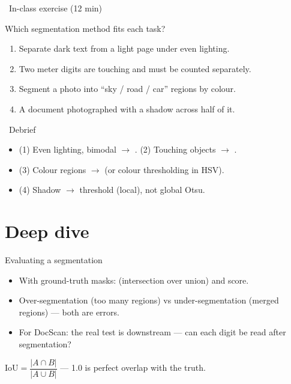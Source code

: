 \documentclass[10pt,aspectratio=169]{beamer}
\begin{document}
\begin{frame}{\faPen~In-class exercise (12 min)}
  \begin{infobox}
  \end{infobox}
  Which segmentation method fits each task?
  \begin{enumerate}
    \item Separate dark text from a light page under even lighting.
    \item Two meter digits are touching and must be counted separately.
    \item Segment a photo into ``sky / road / car'' regions by colour.
    \item A document photographed with a shadow across half of it.
  \end{enumerate}
\end{frame}

\begin{frame}{\faPen~Debrief}
  \begin{itemize}
    \item (1) Even lighting, bimodal $\rightarrow$ . (2) Touching objects $\rightarrow$ .
    \item (3) Colour regions $\rightarrow$  (or colour thresholding in HSV).
    \item (4) Shadow $\rightarrow$  threshold (local), not global Otsu.
  \end{itemize}
\end{frame}

\section{Deep dive}

\begin{frame}{Evaluating a segmentation}
  \begin{itemize}
    \item With ground-truth masks:  (intersection over union) and  score.
    \item Over-segmentation (too many regions) vs under-segmentation (merged regions) — both are errors.
    \item For DocScan: the real test is downstream — can each digit be read after segmentation?
  \end{itemize}
  \begin{mathbox}
    $\mathrm{IoU}=\dfrac{|A\cap B|}{|A\cup B|}$ — 1.0 is perfect overlap with the truth.
  \end{mathbox}
\end{frame}
\end{document}
